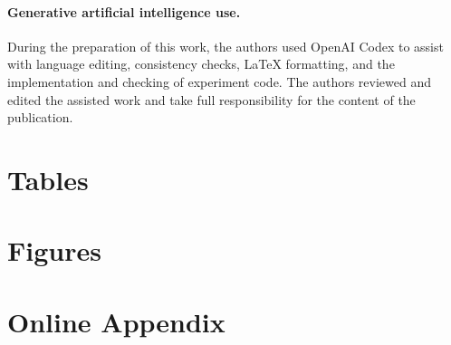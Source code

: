 \documentclass{article}
\theoremstyle{definition}
\theoremstyle{remark}
\begin{document}
\paragraph{Generative artificial intelligence use.}
During the preparation of this work, the authors used OpenAI Codex to
assist with language editing, consistency checks, LaTeX formatting,
and the implementation and checking of experiment code. The authors
reviewed and edited the assisted work and take full responsibility for
the content of the publication.

\clearpage



\clearpage
\section*{Tables}


\clearpage
\section*{Figures}


\clearpage
\appendix
\section*{Online Appendix}
\renewcommand{\thesection}{S\arabic{section}}
\renewcommand{\thesubsection}{S\arabic{section}.\arabic{subsection}}
\renewcommand{\thefigure}{S\arabic{figure}}
\renewcommand{\thetable}{S\arabic{table}}
\renewcommand{\theequation}{S\arabic{equation}}
\renewcommand{\theHsection}{supp.\arabic{section}}
\renewcommand{\theHsubsection}{supp.\arabic{section}.\arabic{subsection}}
\renewcommand{\theHfigure}{supp.\arabic{figure}}
\renewcommand{\theHtable}{supp.\arabic{table}}
\renewcommand{\theHequation}{supp.\arabic{equation}}
\setcounter{section}{0}
\setcounter{figure}{0}
\setcounter{table}{0}
\setcounter{equation}{0}




\end{document}
